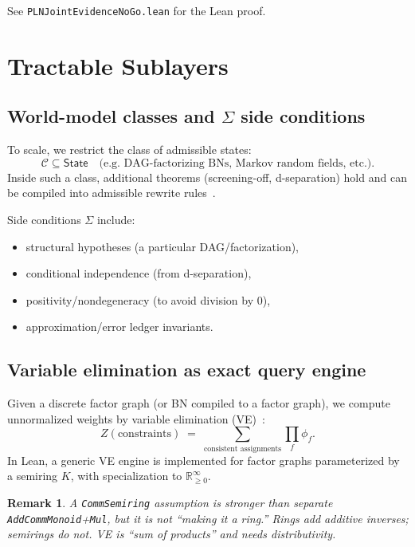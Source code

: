 \documentclass[]{article}
\newtheorem{remark}[theorem]{Remark}
\newcommand{\code}[1]{\texttt{#1}}
\newcommand{\State}{\mathsf{State}}
\newcommand{\side}{\Sigma}
\begin{document}
See \code{PLNJointEvidenceNoGo.lean} for the Lean proof.


\section{Tractable Sublayers}
\label{sec:sublayers}

\subsection{World-model classes and $\Sigma$ side conditions}

To scale, we restrict the class of admissible states:
\[
  \mathcal{C} \subseteq \State
  \quad \text{(e.g.\ DAG-factorizing BNs, Markov random fields, etc.)}.
\]
Inside such a class, additional theorems (screening-off, d-separation) hold
and can be compiled into admissible rewrite rules~\cite{Pearl1988}.

Side conditions $\side$ include:
\begin{itemize}[leftmargin=2em]
\item structural hypotheses (a particular DAG/factorization),
\item conditional independence (from d-separation),
\item positivity/nondegeneracy (to avoid division by $0$),
\item approximation/error ledger invariants.
\end{itemize}


\subsection{Variable elimination as exact query engine}

Given a discrete factor graph (or BN compiled to a factor graph), we
compute unnormalized weights by variable elimination (VE)~\cite{Dechter1999}:
\[
  Z(\text{constraints}) \;=\; \sum_{\text{consistent assignments}}
  \prod_f \phi_f.
\]
In Lean, a generic VE engine is implemented for factor graphs parameterized
by a semiring $K$, with specialization to $\mathbb{R}_{\ge 0}^\infty$.

\begin{remark}
A \code{CommSemiring} assumption is \emph{stronger} than separate
\code{AddCommMonoid}+\code{Mul}, but it is not ``making it a ring.''
Rings add additive inverses; semirings do not. VE is ``sum of products''
and needs distributivity.
\end{remark}
\end{document}
